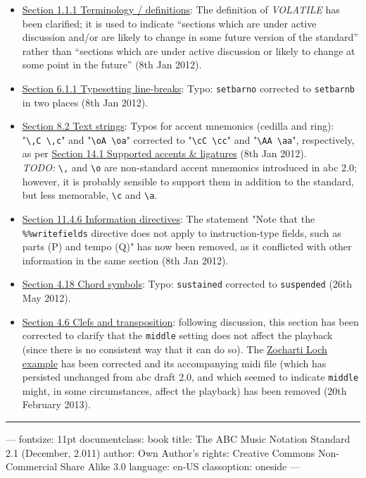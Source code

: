 \documentclass[oneside]{book}
\begin{document}
\begin{itemize}
\item
  \protect\hyperlink{terminology_definitions}{Section 1.1.1 Terminology
  / definitions}: The definition of \emph{VOLATILE} has been clarified;
  it is used to indicate ``sections which are under active discussion
  and/or are likely to change in some future version of the standard''
  rather than ``sections which are under active discussion or likely to
  change at some point in the future'' (8th Jan 2012).
\item
  \protect\hyperlink{typesetting_line-breaks}{Section 6.1.1 Typesetting
  line-breaks}: Typo: \texttt{setbarno} corrected to \texttt{setbarnb}
  in two places (8th Jan 2012).
\item
  \protect\hyperlink{text_strings}{Section 8.2 Text strings}: Typos for
  accent mnemonics (cedilla and ring):
  "\texttt{\textbackslash{},C\ \textbackslash{},c}" and
  "\texttt{\textbackslash{}oA\ \textbackslash{}oa}" corrected to
  "\texttt{\textbackslash{}cC\ \textbackslash{}cc}" and
  "\texttt{\textbackslash{}AA\ \textbackslash{}aa}", respectively, as
  per \protect\hyperlink{supported_accents_ligatures}{Section 14.1
  Supported accents \& ligatures} (8th Jan 2012).\\
  \emph{TODO:} \texttt{\textbackslash{},} and \texttt{\textbackslash{}o}
  are non-standard accent mnemonics introduced in abc 2.0; however, it
  is probably sensible to support them in addition to the standard, but
  less memorable, \texttt{\textbackslash{}c} and
  \texttt{\textbackslash{}a}.
\item
  \protect\hyperlink{information_directives}{Section 11.4.6 Information
  directives}: The statement "Note that the \texttt{\%\%writefields}
  directive does not apply to instruction-type fields, such as parts (P)
  and tempo (Q)" has now been removed, as it conflicted with other
  information in the same section (8th Jan 2012).
\item
  \protect\hyperlink{chord_symbols}{Section 4.18 Chord symbols}: Typo:
  \texttt{sustained} corrected to \texttt{suspended} (26th May 2012).
\item
  \protect\hyperlink{clefs_and_transposition}{Section 4.6 Clefs and
  transposition}: following discussion, this section has been corrected
  to clarify that the \texttt{middle} setting does not affect the
  playback (since there is no consistent way that it can do so). The
  \protect\hyperlink{multiple_voices}{Zocharti Loch example} has been
  corrected and its accompanying midi file (which has persisted
  unchanged from abc draft 2.0, and which seemed to indicate
  \texttt{middle} might, in some circumstances, affect the playback) has
  been removed (20th February 2013).
\end{itemize}

\begin{center}\rule{0.5\linewidth}{\linethickness}\end{center}

--- fontsize: 11pt documentclass: book title: The ABC Music Notation
Standard 2.1 (December, 2.011) author: Own Author's rights: Creative
Commons Non-Commercial Share Alike 3.0 language: en-US classoption:
oneside ---
\end{document}
